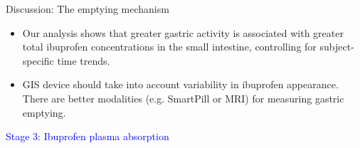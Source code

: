 \documentclass[handout]{beamer}
\begin{document}
\begin{frame}{Discussion: The emptying mechanism}
\small

\begin{itemize}
	\setlength\itemsep{1em}
	\item Our analysis shows that greater gastric activity is associated with greater total ibuprofen concentrations in the small intestine, controlling for subject-specific time trends.
	\item GIS device should take into account variability in ibuprofen appearance. There are better modalities (e.g. SmartPill or MRI) for measuring gastric emptying.
\end{itemize}


\end{frame}


\begin{frame}
\begin{center}
\LARGE \textcolor{blue}{Stage 3: Ibuprofen plasma absorption}
\end{center}
\end{frame}
\end{document}
